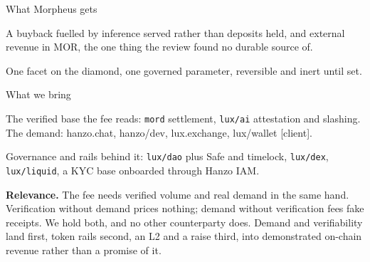 \documentclass[11pt,a4paper]{article}
\newcommand{\code}[1]{\texttt{\small #1}}
\begin{document}
\begin{stake}{What Morpheus gets}
\item A buyback fuelled by inference served rather than deposits held, and external revenue in
      MOR, the one thing the review found no durable source of.
\item One facet on the diamond, one governed parameter, reversible and inert until set.
\end{stake}

\begin{stake}{What we bring}
\item The verified base the fee reads: \code{mord} settlement, \code{lux/ai} attestation and
      slashing. The demand: hanzo.chat, hanzo/dev, lux.exchange, lux/wallet [client].
\item Governance and rails behind it: \code{lux/dao} plus Safe and timelock, \code{lux/dex},
      \code{lux/liquid}, a KYC base onboarded through Hanzo IAM.
\end{stake}

\noindent\textbf{Relevance.}
The fee needs verified volume and real demand in the same hand. Verification without demand
prices nothing; demand without verification fees fake receipts. We hold both, and no other
counterparty does. Demand and verifiability land first, token rails second, an L2 and a raise
third, into demonstrated on-chain revenue rather than a promise of it.

\vspace{0.5ex}
\end{document}
